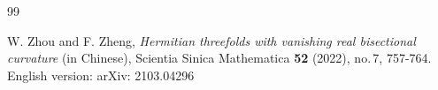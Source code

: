 \documentclass{amsart}
\begin{document}
\begin{thebibliography}{99}







  W. Zhou and F. Zheng, \emph{ Hermitian threefolds with vanishing real bisectional curvature} (in Chinese), Scientia Sinica Mathematica {\bf 52} (2022), no.\,7, 757-764. English version: arXiv: 2103.04296
    
    
\end{thebibliography}
\end{document}
